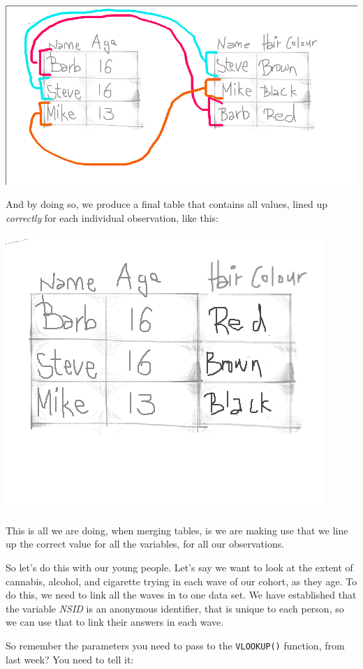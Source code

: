\documentclass[]{book}
\theoremstyle{definition}
\theoremstyle{definition}
\theoremstyle{definition}
\theoremstyle{remark}
\begin{document}
\includegraphics{imgs/merge_logic_1.png}

And by doing so, we produce a final table that contains all values,
lined up \emph{correctly} for each individual observation, like this:

\includegraphics{imgs/merge_logic_2.png}

This is all we are doing, when merging tables, is we are making use that
we line up the correct value for all the variables, for all our
observations.

So let's do this with our young people. Let's say we want to look at the
extent of cannabis, alcohol, and cigarette trying in each wave of our
cohort, as they age. To do this, we need to link all the waves in to one
data set. We have established that the variable \emph{NSID} is an
anonymous identifier, that is unique to each person, so we can use that
to link their answers in each wave.

So remember the parameters you need to pass to the \texttt{VLOOKUP()}
function, from last week? You need to tell it:
\end{document}
